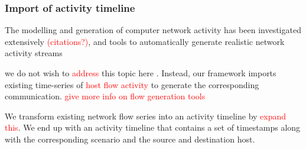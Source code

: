 \documentclass[runningheads]{llncs}
\begin{document}
\subsubsection*{Import of activity timeline}

The modelling and generation of computer network activity has been investigated extensively \textcolor{red}{(citations?)}, and tools to automatically generate realistic network activity streams 

we do not wish to \textcolor{red}{address} this topic here . Instead, our framework imports existing time-series of \textcolor{red}{host flow activity} to generate the corresponding communication. \textcolor{red}{give more info on flow generation tools} 

We transform existing network flow series into an activity timeline by \textcolor{red}{expand this}. We end up with an activity timeline that contains a set of timestamps along with the corresponding scenario and the source and destination host. 










 


\end{document}
